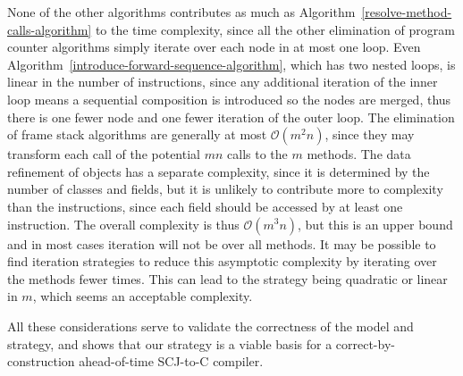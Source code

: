 {None of the other algorithms contributes as much as
Algorithm~\ref{resolve-method-calls-algorithm} to the time complexity,
since all the other elimination of program counter algorithms simply
iterate over each node in at most one loop. 
Even Algorithm~\ref{introduce-forward-sequence-algorithm}, which has
two nested loops, is linear in the number of instructions, since any
additional iteration of the inner loop means a sequential composition
is introduced so the nodes are merged, thus there is one fewer node
and one fewer iteration of the outer loop.
The elimination of frame stack algorithms are generally at most
$\mathcal{O}(m^2n)$, since they may transform each call of the
potential $mn$ calls to the $m$ methods.
The data refinement of objects has a separate complexity, since it is
determined by the number of classes and fields, but it is unlikely to
contribute more to complexity than the instructions, since each field
should be accessed by at least one instruction.
The overall complexity is thus $\mathcal{O}(m^3n)$, but this is an
upper bound and in most cases iteration will not be over all methods.
It may be possible to find iteration strategies to reduce this
asymptotic complexity by iterating over the methods fewer times.
This can lead to the strategy being quadratic or linear in $m$, which
seems an acceptable complexity.
}

All these considerations serve to validate the correctness of the
model and strategy, and shows that our strategy is a viable basis for
a correct-by-construction ahead-of-time SCJ-to-C compiler.
